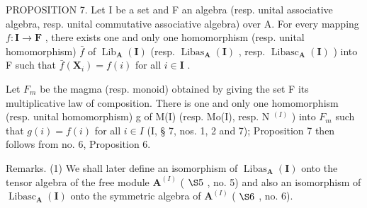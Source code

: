 PROPOSITION 7. Let I be a set and F an algebra (resp. unital associative algebra, resp. unital commutative associative algebra) over A. For every mapping \(f:\mathbf{I}\to\mathbf{F}\) , there exists one and only one homomorphism (resp. unital homomorphism) \(\bar{f}\) of \(\operatorname{Lib}_{\mathbf{A}}(\mathbf{I})\) (resp. \(\operatorname{Libas}_{\mathbf{A}}(\mathbf{I})\) , resp. \(\operatorname{Libasc}_{\mathbf{A}}(\mathbf{I})\) ) into F such that \(\bar{f}(\mathbf{X}_{i})=f(i)\) for all \(i\in\mathbf{I}\) .

Let \(F_{m}\) be the magma (resp. monoid) obtained by giving the set F its multiplicative law of composition. There is one and only one homomorphism (resp. unital homomorphism) g of M(I) (resp. Mo(I), resp. N \(^{(I)}\) ) into \(F_{m}\) such that \(g(i) = f(i)\) for all \(i \in I\) (I, § 7, nos. 1, 2 and 7); Proposition 7 then follows from no. 6, Proposition 6.

Remarks. (1) We shall later define an isomorphism of \(\operatorname{Libas}_{\mathbf{A}}(\mathbf{I})\) onto the tensor algebra of the free module \(\mathbf{A}^{(I)}\) ( \(\S 5\) , no. 5) and also an isomorphism of \(\operatorname{Libasc}_{\mathbf{A}}(\mathbf{I})\) onto the symmetric algebra of \(\mathbf{A}^{(I)}\) ( \(\S 6\) , no. 6).

